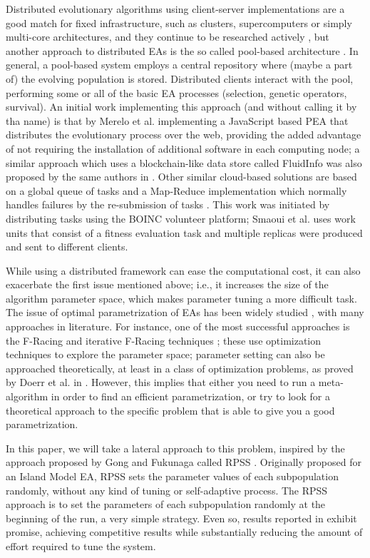 \documentclass[conference]{IEEEtran}
\begin{document}
Distributed evolutionary algorithms using client-server implementations are a good match for fixed infrastructure, such as clusters, supercomputers or simply multi-core architectures, and they continue to be researched actively \cite{Liu201954}, but another approach to distributed EAs is the so called pool-based architecture \cite{sofea:naco}. In general, a
pool-based system employs a central repository where (maybe a part of) the evolving population is stored.
Distributed clients interact with the pool, performing some or all of the basic EA processes
(selection, genetic operators, survival). An initial work implementing this approach (and without calling it by tha name)
is that by Merelo et al. \cite{agajaj} implementing a JavaScript based PEA that distributes
the evolutionary process over the web, providing the added advantage of not requiring the
installation of additional software in each computing node; a similar approach which uses a blockchain-like data store called FluidInfo \cite{radcliffe2012getting} was also proposed by the same authors in \cite{DBLP:conf/cec/Merelo10}.  Other similar cloud-based solutions
are based on a global queue of tasks and a Map-Reduce implementation which normally handles failures
by the re-submission of  tasks \cite{fazenda2012,di2013towards,FlexGP}. This work was initiated by distributing tasks using the BOINC
volunteer platform;  Smaoui et al. \cite{FekiNG09} uses work units that consist of a fitness
evaluation task and multiple replicas  were produced and sent to different clients.

While using a distributed framework can ease the computational cost, it can also exacerbate the first issue mentioned above;
i.e., it increases the size of the algorithm parameter space, which makes parameter tuning a more difficult task.
The issue of optimal parametrization of EAs has been  widely studied \cite{de2007parameter},
with many approaches in literature. For instance, one of the most successful approaches
is the F-Racing and iterative F-Racing techniques \cite{lopez2011irace}; these use optimization techniques to explore the parameter space; parameter setting can also be approached theoretically, at least in a class of optimization problems, as proved by Doerr et al. in \cite{doerr2020theory}. However, this implies that either you need to run a meta-algorithm in order to find an efficient parametrization, or try to look for a theoretical approach to the specific problem that is able to give you a good parametrization. 

In this paper, we will take a lateral approach to this problem,
inspired by the approach proposed by Gong and Fukunaga called RPSS
\cite{fuku1,fuku2}.  Originally proposed for an Island Model EA, RPSS
sets the parameter values of each subpopulation randomly, without any
kind of tuning or self-adaptive process. The RPSS approach is to set
the parameters of each subpopulation randomly at the beginning of the
run, a very simple strategy.  Even so, results reported in
\cite{fuku1,fuku2} exhibit promise, achieving competitive results
while substantially reducing the amount of effort required to tune the
system.
\end{document}
